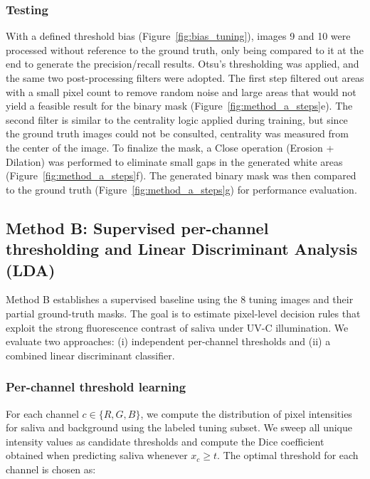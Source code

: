 \subsubsection{Testing}

With a defined threshold bias (Figure~\ref{fig:bias_tuning}), images 9 and 10 were processed without reference to the ground truth, only being compared to it at the end to generate the precision/recall results. Otsu's thresholding was applied, and the same two post-processing filters were adopted. The first step filtered out areas with a small pixel count to remove random noise and large areas that would not yield a feasible result for the binary mask (Figure~\ref{fig:method_a_steps}e). The second filter is similar to the centrality logic applied during training, but since the ground truth images could not be consulted, centrality was measured from the center of the image. To finalize the mask, a Close operation (Erosion + Dilation) was performed to eliminate small gaps in the generated white areas (Figure~\ref{fig:method_a_steps}f). The generated binary mask was then compared to the ground truth (Figure~\ref{fig:method_a_steps}g) for performance evaluation.

\subsection{Method B: Supervised per-channel thresholding and Linear Discriminant Analysis (LDA)}

Method B establishes a supervised baseline using the 8 tuning images and their partial ground-truth masks. The goal is to estimate pixel-level decision rules that exploit the strong fluorescence contrast of saliva under UV-C illumination. We evaluate two approaches: (i) independent per-channel thresholds and (ii) a combined linear discriminant classifier.

\subsubsection{Per-channel threshold learning}

For each channel \(c \in \{R,G,B\}\), we compute the distribution of pixel intensities for saliva and background using the labeled tuning subset. We sweep all unique intensity values as candidate thresholds and compute the Dice coefficient \cite{dice1945measures} obtained when predicting saliva whenever \(x_c \geq t\). The optimal threshold for each channel is chosen as:

